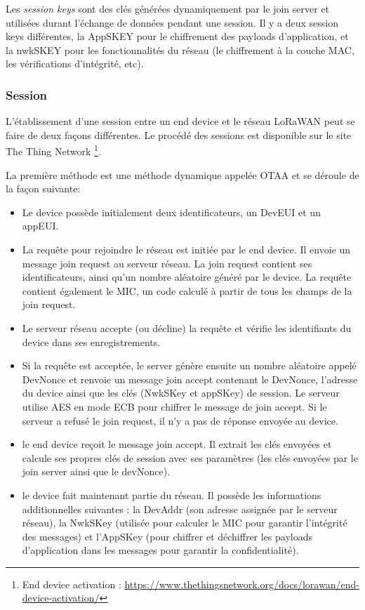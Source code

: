 Les \textit{session keys} sont des clés générées dynamiquement par le join server et utilisées durant l'échange de données pendant une session. Il y a deux session keys différentes, la AppSKEY pour le chiffrement des payloads d'application, et la nwkSKEY pour les fonctionnalités du réseau (le chiffrement à la couche \ac{MAC}, les vérifications d'intégrité, etc).

\subsubsection{Session}

L'établissement d'une session entre un end device et le réseau LoRaWAN peut se faire de deux façons différentes. Le procédé des sessions est disponible sur le site The Thing Network \footnote{End device activation : \href{https://www.thethingsnetwork.org/docs/lorawan/end-device-activation/}{https://www.thethingsnetwork.org/docs/lorawan/end-device-activation/}}.

La première méthode est une méthode dynamique appelée \ac{OTAA} et se déroule de la façon suivante: 
\begin{itemize}
\item Le device possède initialement deux identificateurs, un DevEUI et un appEUI.
\item La requête pour rejoindre le réseau est initiée par le end device. Il envoie un message join request au serveur réseau. La join request contient ses identificateurs, ainsi qu'un nombre aléatoire généré par le device. La requête contient également le \ac{MIC}, un code calculé à partir de tous les champs de la join request.
\item Le serveur réseau accepte (ou décline) la requête et vérifie les identifiants du device dans ses enregistrements.
\item Si la requête est acceptée, le server génère ensuite un nombre aléatoire appelé DevNonce et renvoie un message join accept contenant le DevNonce, l'adresse du device ainsi que les clés (NwkSKey et appSKey) de session. Le serveur utilise \ac{AES} en mode \ac{ECB} pour chiffrer le message de join accept. Si le serveur a refusé le join request, il n'y a pas de réponse envoyée au device.
\item le end device reçoit le message join accept. Il extrait les clés envoyées et calcule ses propres clés de session avec ses paramètres (les clés envoyées par le join server ainsi que le devNonce).
\item le device fait maintenant partie du réseau. Il possède les informations additionnelles suivantes : la DevAddr (son adresse assignée par le serveur réseau), la NwkSKey (utilisée pour calculer le \ac{MIC} pour garantir l'intégrité des messages) et l'AppSKey (pour chiffrer et déchiffrer les payloads d'application dans les messages pour garantir la confidentialité).
\end{itemize}
        
